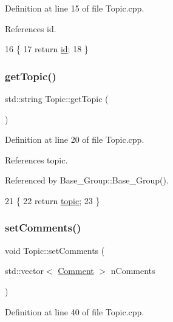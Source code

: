 Definition at line 15 of file Topic.\+cpp.



References id.


\begin{DoxyCode}
16 \{
17     \textcolor{keywordflow}{return} \hyperlink{class_topic_a3f0e95d8c647b06bd9a3e257d86e021a}{id};
18 \}
\end{DoxyCode}
\mbox{\label{class_topic_a9f6ad6642112c5f121a92aceb8df9c43}} 
\subsubsection{\texorpdfstring{get\+Topic()}{getTopic()}}
{\footnotesize\ttfamily std\+::string Topic\+::get\+Topic (\begin{DoxyParamCaption}{ }\end{DoxyParamCaption})}



Definition at line 20 of file Topic.\+cpp.



References topic.



Referenced by Base\+\_\+\+Group\+::\+Base\+\_\+\+Group().


\begin{DoxyCode}
21 \{
22     \textcolor{keywordflow}{return} \hyperlink{class_topic_ae74abf3428c3d51f0e3c95e995d29633}{topic};
23 \}
\end{DoxyCode}
\mbox{\label{class_topic_ada5f53077553db0022f528b0328a7437}} 
\subsubsection{\texorpdfstring{set\+Comments()}{setComments()}}
{\footnotesize\ttfamily void Topic\+::set\+Comments (\begin{DoxyParamCaption}\item[{std\+::vector$<$ \hyperlink{class_comment}{Comment} $>$}]{n\+Comments }\end{DoxyParamCaption})}



Definition at line 40 of file Topic.\+cpp.



